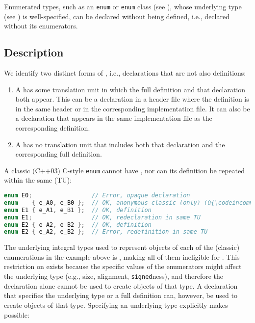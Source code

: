 \label{opaque-enumeration-declarations}

Enumerated types, such as an \lstinline!enum! or \lstinline!enum! class (see ), whose underlying type (see ) is well-specified, can be
declared without being defined, i.e., declared without its enumerators.

\subsection[Description]{Description}\label{description}

We identify two distinct forms of , i.e.,
declarations that are not also definitions:
\begin{enumerate}
\item{A  has some translation unit in which the full definition and that declaration both appear. This can be a declaration in a header file where the definition is in the same header or in the corresponding implementation file. It can also be a declaration that appears in the same implementation file as the corresponding definition.}
\item{A  has no translation unit that includes both that declaration and the corresponding full definition.}
\end{enumerate}

A classic (C++03) C-style \lstinline!enum! cannot have , nor can its definition be repeated within the same
 (TU):

\begin{lstlisting}[language=C++]
enum E0;                 // Error, opaque declaration
enum    { e_A0, e_B0 };  // OK, anonymous classic (only) (ù{\codeincomments{enum}}ù)
enum E1 { e_A1, e_B1 };  // OK, definition
enum E1;                 // OK, redeclaration in same TU
enum E2 { e_A2, e_B2 };  // OK, definition
enum E2 { e_A2, e_B2 };  // Error, redefinition in same TU
\end{lstlisting}

\noindent The underlying integral types used to represent objects of each of the
(classic) enumerations in the example above is , making
all of them ineligible for . This restriction
on  exists because the specific values of
the enumerators might affect the underlying type %
(e.g.,
size, alignment, \lstinline!signed!ness), and therefore the declaration
alone cannot be used to create objects of that type. A declaration that
specifies the underlying type or a full definition can, however, be used
to create objects of that type. Specifying an underlying
type %
explicitly makes  possible:

